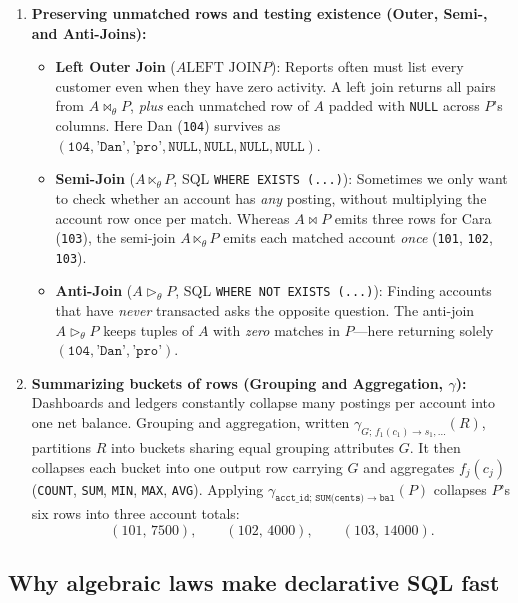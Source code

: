 \begin{enumerate}
  \item \textbf{Preserving unmatched rows and testing existence (Outer, Semi-, and Anti-Joins):}
  \begin{itemize}
    \item \textbf{Left Outer Join} ($A \mathbin{\texttt{LEFT JOIN}} P$): Reports often must list every customer even when they have zero activity. A left join returns all pairs from $A \bowtie_\theta P$, \emph{plus} each unmatched row of $A$ padded with \texttt{NULL} across $P$'s columns. Here Dan (\texttt{104}) survives as $(\texttt{104}, \texttt{'Dan'}, \texttt{'pro'}, \texttt{NULL}, \texttt{NULL}, \texttt{NULL}, \texttt{NULL})$.
    \item \textbf{Semi-Join} ($A \ltimes_\theta P$, SQL \texttt{WHERE EXISTS (...)}): Sometimes we only want to check whether an account has \emph{any} posting, without multiplying the account row once per match. Whereas $A \bowtie P$ emits three rows for Cara (\texttt{103}), the semi-join $A \ltimes_\theta P$ emits each matched account \emph{once} (\texttt{101}, \texttt{102}, \texttt{103}).
    \item \textbf{Anti-Join} ($A \triangleright_\theta P$, SQL \texttt{WHERE NOT EXISTS (...)}): Finding accounts that have \emph{never} transacted asks the opposite question. The anti-join $A \triangleright_\theta P$ keeps tuples of $A$ with \emph{zero} matches in $P$---here returning solely $(\texttt{104}, \texttt{'Dan'}, \texttt{'pro'})$.
  \end{itemize}
  \item \textbf{Summarizing buckets of rows (Grouping and Aggregation, $\gamma$):} Dashboards and ledgers constantly collapse many postings per account into one net balance. Grouping and aggregation, written $\gamma_{G;\, f_1(c_1) \to s_1, \dots}(R)$, partitions $R$ into buckets sharing equal grouping attributes $G$. It then collapses each bucket into one output row carrying $G$ and aggregates $f_j(c_j)$ (\texttt{COUNT}, \texttt{SUM}, \texttt{MIN}, \texttt{MAX}, \texttt{AVG}). Applying $\gamma_{\texttt{acct\_id};\, \texttt{SUM(cents)} \to \texttt{bal}}(P)$ collapses $P$'s six rows into three account totals:
  \[
    (101,\, 7500), \qquad (102,\, 4000), \qquad (103,\, 14000).
  \]
\end{enumerate}

\subsection{Why algebraic laws make declarative SQL fast}

